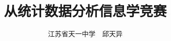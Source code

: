 \documentclass{noithesis}
\title{从统计数据分析信息学竞赛}
\author{江苏省天一中学~~邱天异}
\begin{document}
\begin{NoHyper}

\theoremstyle{plain}
\newtheorem{theorem}{\hspace{2em}定理}[section]
\newtheorem{corollary}{\hspace{2em}推论}[theorem]
\newtheorem{lemma}[theorem]{\hspace{2em}引理}
\newtheorem{proposition}[theorem]{\hspace{2em}命题}
\theoremstyle{definition}
\newtheorem{definition}[theorem]{\hspace{2em}定义}
\newtheorem{assumption}[theorem]{\hspace{2em}假设}

\maketitle



\end{NoHyper}
\end{document}

